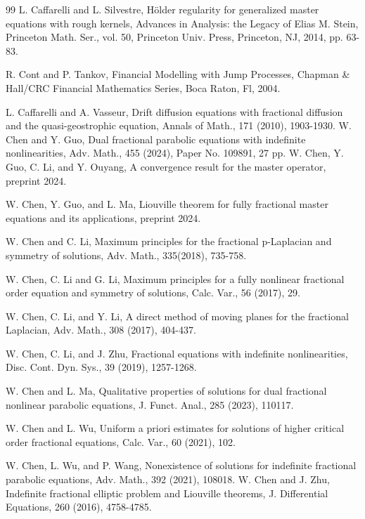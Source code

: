 \documentclass[12pt]{article}
\theoremstyle{remark}
\numberwithin{equation}{section}
\begin{document}
\begin{thebibliography}{99}
 L. Caffarelli and L. Silvestre,  H\"{o}lder regularity for generalized master equations with rough kernels,
Advances in Analysis: the Legacy of Elias M. Stein, Princeton Math. Ser., vol. 50, Princeton Univ. Press,
Princeton, NJ, 2014, pp. 63-83.

 R. Cont and P. Tankov,  Financial Modelling with Jump Processes,   Chapman \& Hall/CRC
Financial Mathematics Series, Boca Raton, Fl, 2004.


 L. Caffarelli and A. Vasseur, Drift diffusion equations with fractional diffusion and the quasi-geostrophic equation, Annals of Math., 171 (2010), 1903-1930.
W. Chen and Y. Guo, Dual fractional parabolic equations with indefinite nonlinearities, Adv. Math., 455 (2024), Paper No. 109891, 27 pp.
 W. Chen, Y. Guo,  C. Li, and Y. Ouyang, A convergence result for the master operator,  preprint 2024.

 W. Chen, Y. Guo, and L. Ma, Liouville theorem  for fully fractional master  equations and its applications, preprint 2024.

 W. Chen and C. Li, Maximum principles for the fractional p-Laplacian and symmetry of solutions, Adv. Math., 335(2018), 735-758.


 W. Chen, C. Li and G. Li, Maximum principles for a fully nonlinear fractional order equation and symmetry of
solutions, Calc. Var., 56 (2017), 29.

 W. Chen, C. Li, and Y. Li, A direct method of moving planes for the fractional Laplacian, Adv. Math., 308 (2017), 404-437.


W. Chen, C. Li, and J. Zhu, Fractional equations with indefinite nonlinearities, Disc. Cont. Dyn. Sys., 39 (2019), 1257-1268.

 W. Chen and L. Ma, Qualitative properties of solutions for dual fractional nonlinear parabolic equations,  J. Funct. Anal.,  285 (2023), 110117.


W. Chen and L. Wu, Uniform a priori estimates for solutions of higher critical order fractional equations, Calc. Var.,
60 (2021), 102.


 W. Chen, L. Wu, and P. Wang, Nonexistence of solutions for indefinite fractional parabolic equations, Adv. Math., 392 (2021), 108018.
W. Chen and J. Zhu, Indefinite fractional elliptic problem and Liouville theorems, J. Differential Equations, 260 (2016), 4758-4785.


\end{thebibliography}
\end{document}
